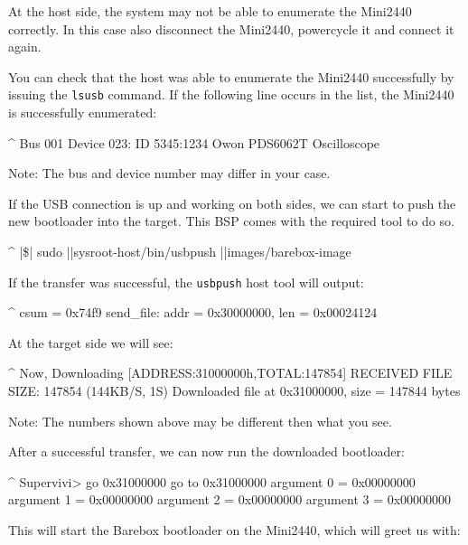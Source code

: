 At the host side, the system may not be able to enumerate the Mini2440
correctly. In this case also disconnect the Mini2440, powercycle it
and connect it again.

You can check that the host was able to enumerate the Mini2440 successfully by
issuing the \texttt{lsusb} command. If the following line occurs in the list,
the Mini2440 is successfully enumerated:

\begin{ptxshell}[escapechar=|]{^}
Bus 001 Device 023: ID 5345:1234 Owon PDS6062T Oscilloscope
\end{ptxshell}

Note: The bus and device number may differ in your case.

If the USB connection is up and working on both sides, we can start to push
the new bootloader into the target. This BSP comes with the required tool to do
so.

\begin{ptxshell}[escapechar=|]{^}
|\$| sudo |\ptxdistPlatformDir |sysroot-host/bin/usbpush |\ptxdistPlatformDir |images/barebox-image
\end{ptxshell}

If the transfer was successful, the \texttt{usbpush} host tool will output:

\begin{ptxshell}[escapechar=|]{^}
csum = 0x74f9
send_file: addr = 0x30000000, len = 0x00024124
\end{ptxshell}

At the target side we will see:

\begin{ptxshell}[escapechar=|]{^}
Now, Downloading [ADDRESS:31000000h,TOTAL:147854]
RECEIVED FILE SIZE:  147854 (144KB/S, 1S)
Downloaded file at 0x31000000, size = 147844 bytes
\end{ptxshell}

Note: The numbers shown above may be different then what you see.

After a successful transfer, we can now run the downloaded bootloader:

\begin{ptxshell}[escapechar=|]{^}
Supervivi>  go 0x31000000
go to 0x31000000
  argument 0 = 0x00000000
  argument 1 = 0x00000000
  argument 2 = 0x00000000
  argument 3 = 0x00000000
\end{ptxshell}

This will start the Barebox bootloader on the Mini2440, which will
greet us with:

